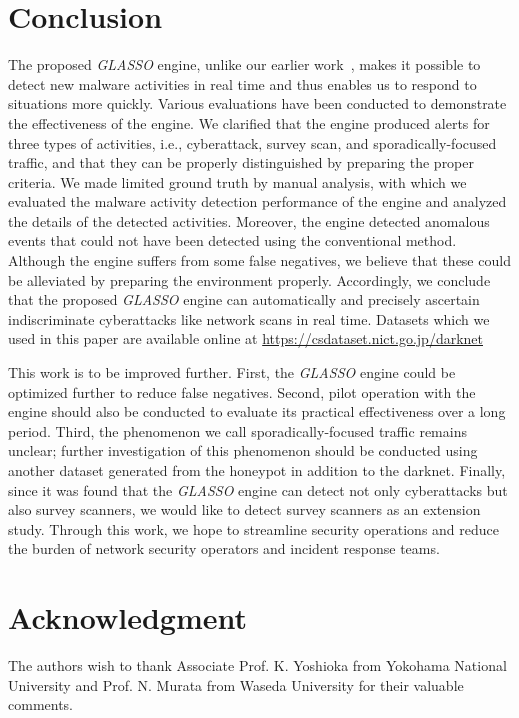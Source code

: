 \documentclass[conference]{IEEEtran}
\begin{document}
\section{Conclusion}
The proposed \textit{GLASSO} engine, unlike our earlier work~\cite{Han}, makes it possible to detect new malware activities in real time and thus enables us to respond to situations more quickly.
Various evaluations have been conducted to demonstrate the effectiveness of the engine.
We clarified that the engine produced alerts for three types of activities, i.e., cyberattack, survey scan, and sporadically-focused traffic, and that they can be properly distinguished by preparing the proper criteria.
We made limited ground truth by manual analysis, with which we evaluated the malware activity detection performance of the engine and analyzed the details of the detected activities.
Moreover, the engine detected anomalous events that could not have been detected using the conventional method.
Although the engine suffers from some false negatives, we believe that these could be alleviated by preparing the environment properly.
Accordingly, we conclude that the proposed \textit{GLASSO} engine can automatically and precisely ascertain indiscriminate cyberattacks like network scans in real time.
Datasets which we used in this paper are available online at \url{https://csdataset.nict.go.jp/darknet}

This work is to be improved further.
First, the \textit{GLASSO} engine could be optimized further to reduce false negatives.
Second, pilot operation with the engine should also be conducted to evaluate its practical effectiveness over a long period.
Third, the phenomenon we call sporadically-focused traffic remains unclear; further investigation of this phenomenon should be conducted using another dataset generated from the honeypot in addition to the darknet.
Finally, since it was found that the \textit{GLASSO} engine can detect not only cyberattacks but also survey scanners, we would like to detect survey scanners as an extension study.
Through this work, we hope to streamline security operations and reduce the burden of network security operators and incident response teams.




\section*{Acknowledgment}
The authors wish to thank Associate Prof. K. Yoshioka from Yokohama National University and  Prof. N. Murata from Waseda University for their valuable comments.
\end{document}
